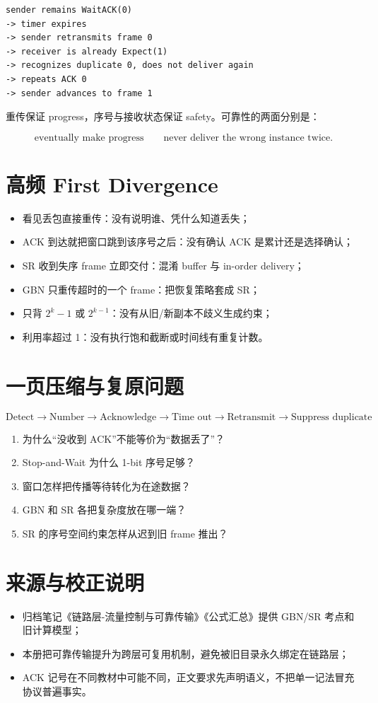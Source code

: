 \documentclass[UTF8,fontset=none,11pt,a4paper]{ctexart}
\providecommand{\tightlist}{\setlength{\itemsep}{0pt}\setlength{\parskip}{0pt}}
\begin{document}
\begin{lstlisting}
sender remains WaitACK(0)
-> timer expires
-> sender retransmits frame 0
-> receiver is already Expect(1)
-> recognizes duplicate 0, does not deliver again
-> repeats ACK 0
-> sender advances to frame 1
\end{lstlisting}

重传保证 progress，序号与接收状态保证 safety。可靠性的两面分别是：

\[
\boxed{\text{eventually make progress}}
\qquad
\boxed{\text{never deliver the wrong instance twice}}.
\]

\section{高频 First
Divergence}\label{12-ux9ad8ux9891-first-divergence}

\begin{itemize}
\tightlist
\item
  看见丢包直接重传：没有说明谁、凭什么知道丢失；
\item
  ACK 到达就把窗口跳到该序号之后：没有确认 ACK 是累计还是选择确认；
\item
  SR 收到失序 frame 立即交付：混淆 buffer 与 in-order delivery；
\item
  GBN 只重传超时的一个 frame：把恢复策略套成 SR；
\item
  只背 \(2^k-1\) 或 \(2^{k-1}\)：没有从旧/新副本不歧义生成约束；
\item
  利用率超过 1：没有执行饱和截断或时间线有重复计数。
\end{itemize}

\section{一页压缩与复原问题}\label{13-ux4e00ux9875ux538bux7f29ux4e0eux590dux539fux95eeux9898}

\[
\boxed{
\text{Detect}
\to \text{Number}
\to \text{Acknowledge}
\to \text{Time out}
\to \text{Retransmit}
\to \text{Suppress duplicate}
}
\]

\begin{enumerate}
\def\labelenumi{\arabic{enumi}.}
\tightlist
\item
  为什么``没收到 ACK''不能等价为``数据丢了''？
\item
  Stop-and-Wait 为什么 1-bit 序号足够？
\item
  窗口怎样把传播等待转化为在途数据？
\item
  GBN 和 SR 各把复杂度放在哪一端？
\item
  SR 的序号空间约束怎样从迟到旧 frame 推出？
\end{enumerate}

\section{来源与校正说明}\label{14-ux6765ux6e90ux4e0eux6821ux6b63ux8bf4ux660e}

\begin{itemize}
\tightlist
\item
  归档笔记《链路层-流量控制与可靠传输》《公式汇总》提供 GBN/SR
  考点和旧计算模型；
\item
  本册把可靠传输提升为跨层可复用机制，避免被旧目录永久绑定在链路层；
\item
  ACK
  记号在不同教材中可能不同，正文要求先声明语义，不把单一记法冒充协议普遍事实。
\end{itemize}
\end{document}
